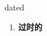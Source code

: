 
\begin{frame}
{\huge dated}
\begin{center}
\begin{enumerate}\Large
  \item \textbf{过时的}
\end{enumerate}
\end{center}
\end{frame}
